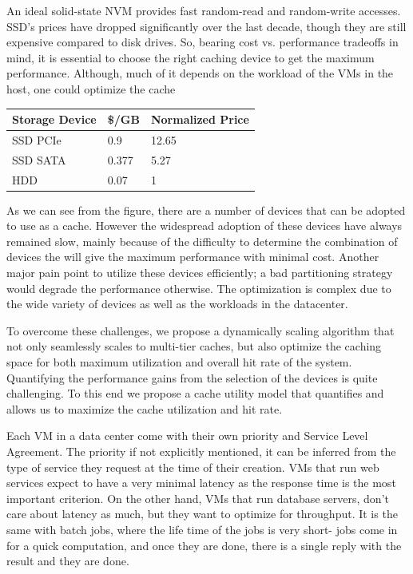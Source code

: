 An ideal solid-state NVM provides fast random-read and random-write accesses. SSD's prices have dropped significantly over the last decade, though they are still expensive compared to disk drives. So, bearing cost vs. performance tradeoffs in mind, it is essential to choose the right caching device to get the maximum performance. Although, much of it depends on the workload of the VMs in the host, one could optimize the cache 

\begin{center}
  \begin{tabular}{ | l | l | l | }
    \hline
    \textbf{Storage Device} & \textbf{\$/GB} & \textbf{Normalized Price} \\ \hline
    SSD PCIe & 0.9 & 12.65 \\ \hline
    SSD SATA & 0.377 & 5.27 \\ \hline
    HDD & 0.07 & 1 \\
    \hline
  \end{tabular}
\end{center}


As we can see from the figure, there are a number of devices that can be adopted to use as a cache. However the widespread adoption of these devices have always remained slow, mainly because of the difficulty to determine the combination of devices the will give the maximum performance with minimal cost. Another major pain point to utilize these devices efficiently; a bad partitioning strategy would degrade the performance otherwise. The optimization is complex due to the wide variety of devices as well as the workloads in the datacenter.

To overcome these challenges, we propose a dynamically scaling algorithm that not only seamlessly scales to multi-tier caches, but also optimize the caching space for both maximum utilization and overall hit rate of the system. Quantifying the performance gains from the selection of the devices is quite challenging. To this end we propose a cache utility model that quantifies and allows us to maximize the cache utilization and hit rate.

Each VM in a data center come with their own priority and Service Level Agreement. The priority if not explicitly mentioned, it can be inferred from the type of service they request at the time of their creation. VMs that run web services expect to have a very minimal latency as the response time is the most important criterion. On the other hand, VMs that run database servers, don't care about latency as much, but they want to optimize for throughput. It is the same with batch jobs, where the life time of the jobs is very short- jobs come in for a quick computation, and once they are done, there is a single reply with the result and they are done.

